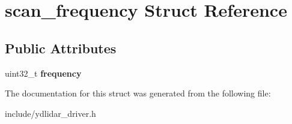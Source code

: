 \hypertarget{structscan__frequency}{}\section{scan\+\_\+frequency Struct Reference}
\label{structscan__frequency}
\subsection*{Public Attributes}
\begin{DoxyCompactItemize}
\item 
uint32\+\_\+t {\bfseries frequency}\hypertarget{structscan__frequency_ae4f2152e77416cff02f44452355f2808}{}\label{structscan__frequency_ae4f2152e77416cff02f44452355f2808}

\end{DoxyCompactItemize}


The documentation for this struct was generated from the following file\+:\begin{DoxyCompactItemize}
\item 
include/ydlidar\+\_\+driver.\+h\end{DoxyCompactItemize}
